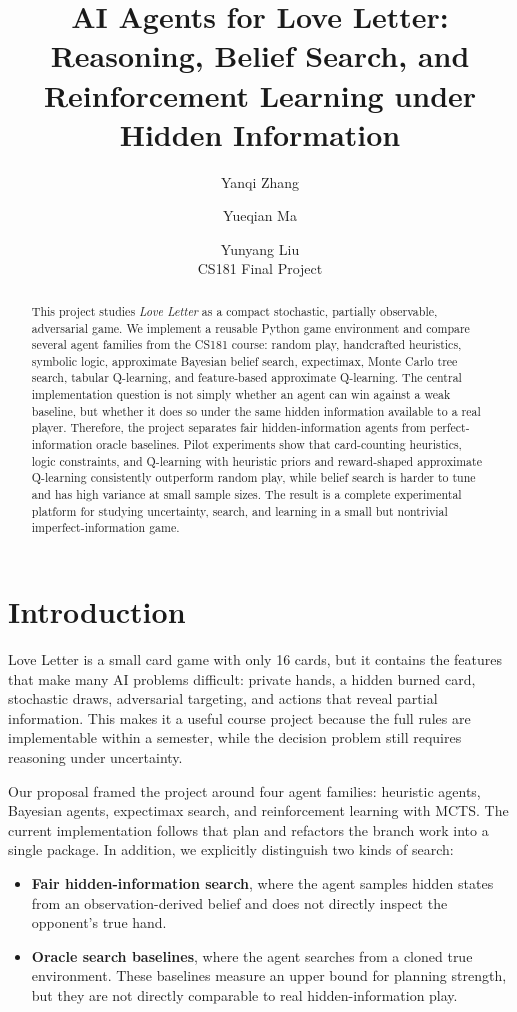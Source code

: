 \documentclass[10pt,twocolumn]{article}
\title{\vspace{-0.5em}AI Agents for Love Letter:\\
Reasoning, Belief Search, and Reinforcement Learning under Hidden Information}
\author{
Yanqi Zhang \and Yueqian Ma \and Yunyang Liu\\
CS181 Final Project
}
\date{}
\begin{document}
\maketitle

\begin{abstract}
This project studies \emph{Love Letter} as a compact stochastic,
partially observable, adversarial game. We implement a reusable Python game
environment and compare several agent families from the CS181 course:
random play, handcrafted heuristics, symbolic logic, approximate Bayesian
belief search, expectimax, Monte Carlo tree search, tabular Q-learning, and
feature-based approximate Q-learning.
The central implementation question is not simply whether an agent can win
against a weak baseline, but whether it does so under the same hidden
information available to a real player. Therefore, the project separates
fair hidden-information agents from perfect-information oracle baselines.
Pilot experiments show that card-counting heuristics, logic constraints, and
Q-learning with heuristic priors and reward-shaped approximate Q-learning
consistently outperform random play, while belief search is harder to tune and
has high variance at small sample sizes.
The result is a complete experimental platform for studying uncertainty,
search, and learning in a small but nontrivial imperfect-information game.
\end{abstract}

\section{Introduction}

Love Letter is a small card game with only 16 cards, but it contains the
features that make many AI problems difficult: private hands, a hidden
burned card, stochastic draws, adversarial targeting, and actions that
reveal partial information. This makes it a useful course project because
the full rules are implementable within a semester, while the decision
problem still requires reasoning under uncertainty.

Our proposal framed the project around four agent families: heuristic
agents, Bayesian agents, expectimax search, and reinforcement learning with
MCTS. The current implementation follows that plan and refactors the branch
work into a single package. In addition, we explicitly distinguish two kinds
of search:
\begin{itemize}
    \item \textbf{Fair hidden-information search}, where the agent samples
    hidden states from an observation-derived belief and does not directly
    inspect the opponent's true hand.
    \item \textbf{Oracle search baselines}, where the agent searches from a
    cloned true environment. These baselines measure an upper bound for
    planning strength, but they are not directly comparable to real
    hidden-information play.
\end{itemize}
\end{document}
